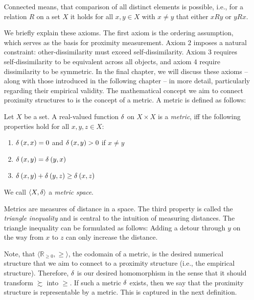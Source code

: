 \begin{rem*}[Connectedness]
	Connected means, that comparison of all distinct elements is possible, i.e., for a relation $R$ on a set $X$ it holds for all $x, y \in X$ with $x \neq y$ that either $xRy$ or $yRx$.
\end{rem*}

We briefly explain these axioms.
The first axiom is the ordering assumption, which serves as the basis for proximity measurement.
Axiom 2 imposes a natural constraint: other-dissimilarity must exceed self-dissimilarity.
Axiom 3 requires self-dissimilarity to be equivalent across all objects, and axiom 4 require dissimilarity to be symmetric.
In the final chapter, we will discuss these axioms -- along with those introduced in the following chapter -- in more detail, particularly regarding their empirical validity.
The mathematical concept we aim to connect proximity structures to is the concept of a metric. A metric is defined as follows:

\begin{defi}[Metric]   \label{def-metric} %
	Let $X$ be a set. A real-valued function $\operatorname{\delta}$ on $X \times X$ is a \emph{metric}, iff the following properties hold for all $x, y, z \in X$:
	\begin{enumerate}[1.]
		\item $\operatorname{\delta}_{} \left( x, x \right) = 0$ and $\operatorname{\delta}_{} \left( x, y \right) > 0$ if $x \neq y$
		\item $\operatorname{\delta}_{} \left( x, y \right) = \operatorname{\delta}_{} \left( y, x \right)$
		\item $\operatorname{\delta}_{} \left( x, y \right) + \operatorname{\delta}_{} \left( y, z \right) \geq \operatorname{\delta}_{} \left( x, z \right)$
	\end{enumerate}
	We call $\langle X, \operatorname{\delta} \rangle$ a \emph{metric space}.
\end{defi}

Metrics are measures of distance in a space. The third property is called the \emph{triangle inequality} and is central to the intuition of measuring distances. The triangle inequality can be formulated as follows: Adding a detour through $y$ on the way from $x$ to $z$ can only increase the distance.

Note, that $\langle \mathbb{R}_{\geq 0}, \geq \rangle$, the codomain of a metric, is the desired numerical structure that we aim to connect to a proximity structure (i.e., the empirical structure).
Therefore, $\operatorname{\delta}$ is our desired homomorphism in the sense that it should transform $\succsim$ into $\geq$.
If such a metric $\operatorname{\delta}$ exists, then we say that the proximity structure is representable by a metric. This is captured in the next definition.

